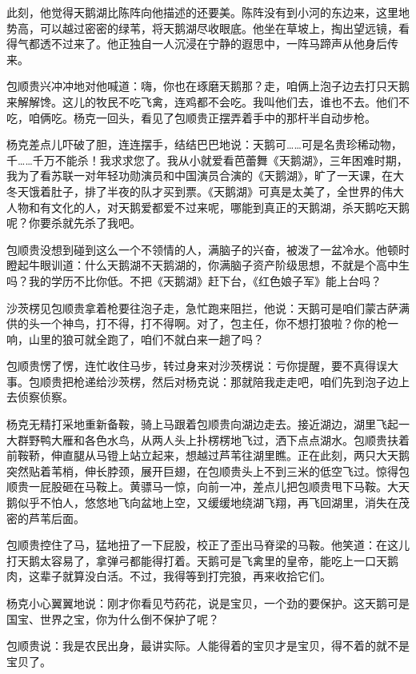 \par 此刻，他觉得天鹅湖比陈阵向他描述的还要美。陈阵没有到小河的东边来，这里地势高，可以越过密密的绿苇，将天鹅湖尽收眼底。他坐在草坡上，掏出望远镜，看得气都透不过来了。他正独自一人沉浸在宁静的遐思中，一阵马蹄声从他身后传来。
\par 包顺贵兴冲冲地对他喊道：嗨，你也在琢磨天鹅那？走，咱俩上泡子边去打只天鹅来解解馋。这儿的牧民不吃飞禽，连鸡都不会吃。我叫他们去，谁也不去。他们不吃，咱俩吃。杨克一回头，看见了包顺贵正摆弄着手中的那杆半自动步枪。
\par 杨克差点儿吓破了胆，连连摆手，结结巴巴地说：天鹅可……可是名贵珍稀动物，千……千万不能杀！我求求您了。我从小就爱看芭蕾舞《天鹅湖》，三年困难时期，我为了看苏联一对年轻功勋演员和中国演员合演的《天鹅湖》，旷了一天课，在大冬天饿着肚子，排了半夜的队才买到票。《天鹅湖》可真是太美了，全世界的伟大人物和有文化的人，对天鹅爱都爱不过来呢，哪能到真正的天鹅湖，杀天鹅吃天鹅呢？你要杀就先杀了我吧。
\par 包顺贵没想到碰到这么一个不领情的人，满脑子的兴奋，被泼了一盆冷水。他顿时瞪起牛眼训道：什么天鹅湖不天鹅湖的，你满脑子资产阶级思想，不就是个高中生吗？我的学历不比你低。不把《天鹅湖》赶下台，《红色娘子军》能上台吗？
\par 沙茨楞见包顺贵拿着枪要往泡子走，急忙跑来阻拦，他说：天鹅可是咱们蒙古萨满供的头一个神鸟，打不得，打不得啊。对了，包主任，你不想打狼啦？你的枪一响，山里的狼可就全跑了，咱们不就白来一趟了吗？
\par 包顺贵愣了愣，连忙收住马步，转过身来对沙茨楞说：亏你提醒，要不真得误大事。包顺贵把枪递给沙茨楞，然后对杨克说：那就陪我走走吧，咱们先到泡子边上去侦察侦察。
\par 杨克无精打采地重新备鞍，骑上马跟着包顺贵向湖边走去。接近湖边，湖里飞起一大群野鸭大雁和各色水鸟，从两人头上扑楞楞地飞过，洒下点点湖水。包顺贵扶着前鞍鞒，伸直腿从马镫上站立起来，想越过芦苇往湖里瞧。正在此刻，两只大天鹅突然贴着苇梢，伸长脖颈，展开巨翅，在包顺贵头上不到三米的低空飞过。惊得包顺贵一屁股砸在马鞍上。黄骠马一惊，向前一冲，差点儿把包顺贵甩下马鞍。大天鹅似乎不怕人，悠悠地飞向盆地上空，又缓缓地绕湖飞翔，再飞回湖里，消失在茂密的芦苇后面。
\par 包顺贵控住了马，猛地扭了一下屁股，校正了歪出马脊梁的马鞍。他笑道：在这儿打天鹅太容易了，拿弹弓都能得打着。天鹅可是飞禽里的皇帝，能吃上一口天鹅肉，这辈子就算没白活。不过，我得等到打完狼，再来收拾它们。
\par 杨克小心翼翼地说：刚才你看见芍药花，说是宝贝，一个劲的要保护。这天鹅可是国宝、世界之宝，你为什么倒不保护了呢？
\par 包顺贵说：我是农民出身，最讲实际。人能得着的宝贝才是宝贝，得不着的就不是宝贝了。
